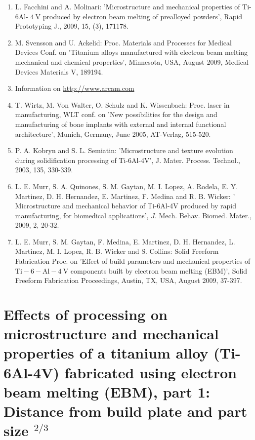 \documentclass[10pt]{article}
\begin{document}
\begin{enumerate}
  \item L. Facchini and A. Molinari: 'Microstructure and mechanical properties of Ti-6Al- $4 \mathrm{~V}$ produced by electron beam melting of prealloyed powders', Rapid Prototyping J., 2009, 15, (3), 171178.

  \item M. Svensson and U. Ackelid: Proc. Materials and Processes for Medical Devices Conf. on 'Titanium alloys manufactured with electron beam melting mechanical and chemical properties', Minnesota, USA, August 2009, Medical Devices Materials V, 189194.

  \item Information on \href{http://www.arcam.com}{http://www.arcam.com}

  \item T. Wirtz, M. Von Walter, O. Schulz and K. Wissenbach: Proc. laser in manufacturing, WLT conf. on 'New possibilities for the design and manufacturing of bone implants with external and internal functional architecture', Munich, Germany, June 2005, AT-Verlag, 515-520.

  \item P. A. Kobryn and S. L. Semiatin: 'Microstructure and texture evolution during solidification processing of Ti-6Al-4V', J. Mater. Process. Technol., 2003, 135, 330-339.

  \item L. E. Murr, S. A. Quinones, S. M. Gaytan, M. I. Lopez, A. Rodela, E. Y. Martinez, D. H. Hernandez, E. Martinez, F. Medina and R. B. Wicker: ' Microstructure and mechanical behavior of Ti-6Al-4V produced by rapid manufacturing, for biomedical applications', $J$. Mech. Behav. Biomed. Mater., 2009, 2, 20-32.

  \item L. E. Murr, S. M. Gaytan, F. Medina, E. Martinez, D. H. Hernandez, L. Martinez, M. I. Lopez, R. B. Wicker and S. Collins: Solid Freeform Fabrication Proc. on 'Effect of build parameters and mechanical properties of $\mathrm{Ti}-6-\mathrm{Al}-4 \mathrm{~V}$ components built by electron beam melting (EBM)', Solid Freeform Fabrication Proceedings, Austin, TX, USA, August 2009, 37-397.

\end{enumerate}

\section*{Effects of processing on microstructure and mechanical properties of a titanium alloy (Ti-6Al-4V) fabricated using electron beam melting (EBM), part 1: Distance from build plate and part size ${ }^{2 / 3}$ }
\end{document}
